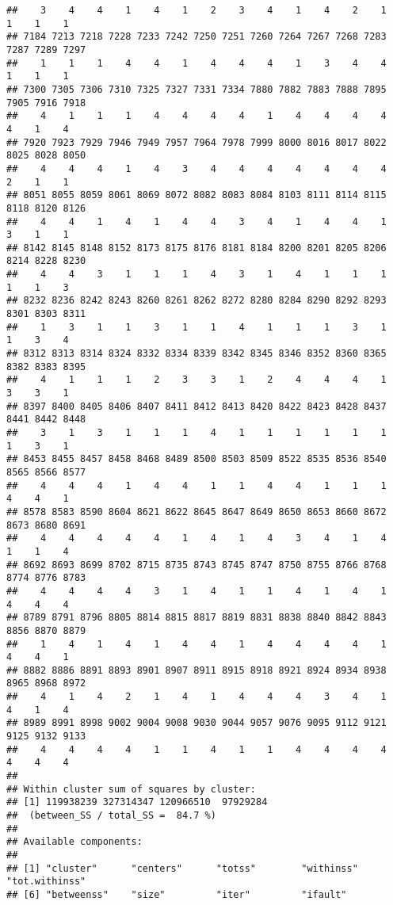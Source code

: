 \documentclass[
]{article}
\begin{document}
\begin{verbatim}
##    3    4    4    1    4    1    2    3    4    1    4    2    1    1    1    1 
## 7184 7213 7218 7228 7233 7242 7250 7251 7260 7264 7267 7268 7283 7287 7289 7297 
##    1    1    1    4    4    1    4    4    4    1    3    4    4    1    1    1 
## 7300 7305 7306 7310 7325 7327 7331 7334 7880 7882 7883 7888 7895 7905 7916 7918 
##    4    1    1    1    4    4    4    4    1    4    4    4    4    4    1    4 
## 7920 7923 7929 7946 7949 7957 7964 7978 7999 8000 8016 8017 8022 8025 8028 8050 
##    4    4    4    1    4    3    4    4    4    4    4    4    4    2    1    1 
## 8051 8055 8059 8061 8069 8072 8082 8083 8084 8103 8111 8114 8115 8118 8120 8126 
##    4    4    1    4    1    4    4    3    4    1    4    4    1    3    1    1 
## 8142 8145 8148 8152 8173 8175 8176 8181 8184 8200 8201 8205 8206 8214 8228 8230 
##    4    4    3    1    1    1    4    3    1    4    1    1    1    1    1    3 
## 8232 8236 8242 8243 8260 8261 8262 8272 8280 8284 8290 8292 8293 8301 8303 8311 
##    1    3    1    1    3    1    1    4    1    1    1    3    1    1    3    4 
## 8312 8313 8314 8324 8332 8334 8339 8342 8345 8346 8352 8360 8365 8382 8383 8395 
##    4    1    1    1    2    3    3    1    2    4    4    4    1    3    3    1 
## 8397 8400 8405 8406 8407 8411 8412 8413 8420 8422 8423 8428 8437 8441 8442 8448 
##    3    1    3    1    1    1    4    1    1    1    1    1    1    1    3    1 
## 8453 8455 8457 8458 8468 8489 8500 8503 8509 8522 8535 8536 8540 8565 8566 8577 
##    4    4    4    1    4    4    1    1    4    4    1    1    1    4    4    1 
## 8578 8583 8590 8604 8621 8622 8645 8647 8649 8650 8653 8660 8672 8673 8680 8691 
##    4    4    4    4    4    1    4    1    4    3    4    1    4    1    1    4 
## 8692 8693 8699 8702 8715 8735 8743 8745 8747 8750 8755 8766 8768 8774 8776 8783 
##    4    4    4    4    3    1    4    1    1    4    1    4    1    4    4    4 
## 8789 8791 8796 8805 8814 8815 8817 8819 8831 8838 8840 8842 8843 8856 8870 8879 
##    1    4    1    4    1    4    4    1    4    4    4    4    1    4    4    1 
## 8882 8886 8891 8893 8901 8907 8911 8915 8918 8921 8924 8934 8938 8965 8968 8972 
##    4    1    4    2    1    4    1    4    4    4    3    4    1    4    1    4 
## 8989 8991 8998 9002 9004 9008 9030 9044 9057 9076 9095 9112 9121 9125 9132 9133 
##    4    4    4    4    1    1    4    1    1    4    4    4    4    4    4    4 
## 
## Within cluster sum of squares by cluster:
## [1] 119938239 327314347 120966510  97929284
##  (between_SS / total_SS =  84.7 %)
## 
## Available components:
## 
## [1] "cluster"      "centers"      "totss"        "withinss"     "tot.withinss"
## [6] "betweenss"    "size"         "iter"         "ifault"
\end{verbatim}
\end{document}
